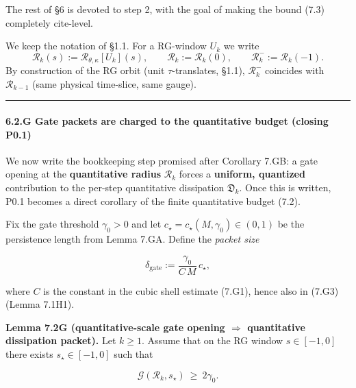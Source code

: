 \documentclass[
  11pt,
]{article}
\begin{document}
The rest of §6 is devoted to step 2, with the goal of making the bound (7.3) completely cite-level.

We keep the notation of §1.1. For a RG-window \(U_k\) we write \[
\mathcal R_k(s):=\mathcal R_{\theta,\kappa}[U_k](s),\qquad
\mathcal R_k:=\mathcal R_k(0),\qquad
\mathcal R_k^-:=\mathcal R_k(-1).
\] By construction of the RG orbit (unit \(\tau\)-translates, §1.1), \(\mathcal R_k^-\) coincides with \(\mathcal R_{k-1}\) (same physical time-slice, same gauge).

\begin{center}\rule{0.5\linewidth}{0.5pt}\end{center}

\hypertarget{g-gate-packets-are-charged-to-the-quantitative-budget-closing-p0.1}{%
\paragraph{6.2.G Gate packets are charged to the quantitative budget (closing P0.1)}\label{g-gate-packets-are-charged-to-the-quantitative-budget-closing-p0.1}}

We now write the bookkeeping step promised after Corollary 7.GB: a gate opening at the \textbf{quantitative radius} \(\mathcal R_k\) forces a \textbf{uniform, quantized} contribution to the per-step quantitative dissipation \(\mathfrak D_k\). Once this is written, P0.1 becomes a direct corollary of the finite quantitative budget (7.2).

Fix the gate threshold \(\gamma_0>0\) and let \(c_\star=c_\star(M,\gamma_0)\in(0,1)\) be the persistence length from Lemma 7.GA. Define the \emph{packet size}

\begin{equation}
\delta_{\mathrm{gate}}
:=\frac{\gamma_0}{C\,M}\,c_\star,
\tag{7.GP}\label{eq:7GP_packet_size}
\end{equation}

where \(C\) is the constant in the cubic shell estimate (7.G1), hence also in (7.G3) (Lemma 7.1H1).

\textbf{Lemma 7.2G (quantitative-scale gate opening \(\Rightarrow\) quantitative dissipation packet).} Let \(k\ge 1\). Assume that on the RG window \(s\in[-1,0]\) there exists \(s_\star\in[-1,0]\) such that

\begin{equation}
\mathcal G(\mathcal R_k,s_\star)\ \ge\ 2\gamma_0.
\tag{7.2G1}\label{eq:7_2G1_gate_open}
\end{equation}
\end{document}
